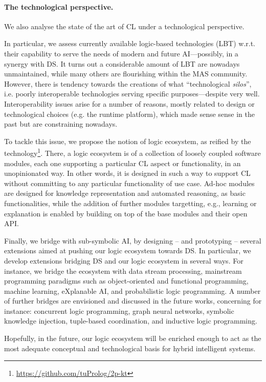 \documentclass[12pt]{scrartcl}
\begin{document}
\paragraph{The technological perspective.}

We also analyse the state of the art of CL under a technological perspective.

In particular, we assess currently available logic-based technologies (LBT) w.r.t. their capability to serve the needs of modern and future AI---possibly, in a synergy with DS.
%
It turns out a considerable amount of LBT are nowadays unmaintained, while many others are flourishing within the MAS community.
%
However, there is tendency towards the creations of what ``technological \emph{silos}'', i.e. poorly interoperable technologies serving specific purposes---despite very well.
%
Interoperability issues arise for a number of reasons, mostly related to design or technological choices (e.g. the runtime platform), which made sense sense in the past but are constraining nowadays.

To tackle this issue, we propose the notion of logic ecosystem, as reified by the \twopkt{} technology\footnote{\url{https://github.com/tuProlog/2p-kt}}.
%
There, a logic ecosystem is of a collection of loosely coupled software modules, each one supporting a particular CL aspect or functionality, in an unopinionated way.
%
In other words, it is designed in such a way to support CL without committing to any particular functionality of use case.
%
Ad-hoc modules are designed for knowledge representation and automated reasoning, as basic functionalities, while the addition of further modules targetting, e.g., learning or explanation is enabled by building on top of the base modules and their open API.
%

Finally, we bridge \twopkt{} with sub-symbolic AI, by designing -- and prototyping -- several extensions aimed at pushing our logic ecosystem towards DS.
%
%
In particular, we develop extensions bridging DS and our logic ecosystem in several ways.
%
For instance, we bridge the ecosystem with data stream processing, mainstream programming paradigms such as object-oriented and functional programming, machine learning, eXplanable AI, and probabilistic logic programming.
%
A number of further bridges are envisioned and discussed in the future works, concerning for instance: concurrent logic programming, graph neural networks, symbolic knowledge injection, tuple-based coordination, and inductive logic programming.

Hopefully, in the future, our logic ecosystem will be enriched enough to act as the most adequate conceptual and technological basis for hybrid intelligent systems.
\end{document}
